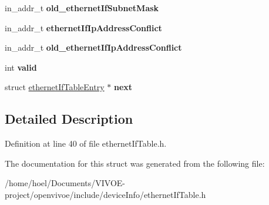 \begin{DoxyCompactItemize}
\item 
in\+\_\+addr\+\_\+t {\bfseries old\+\_\+ethernet\+If\+Subnet\+Mask}\hypertarget{structethernetIfTableEntry_a87976ec94cbf9aaa5c88cf82da388ba0}{}\label{structethernetIfTableEntry_a87976ec94cbf9aaa5c88cf82da388ba0}

\item 
in\+\_\+addr\+\_\+t {\bfseries ethernet\+If\+Ip\+Address\+Conflict}\hypertarget{structethernetIfTableEntry_a974502ae05ad855239d8cd9972effcb9}{}\label{structethernetIfTableEntry_a974502ae05ad855239d8cd9972effcb9}

\item 
in\+\_\+addr\+\_\+t {\bfseries old\+\_\+ethernet\+If\+Ip\+Address\+Conflict}\hypertarget{structethernetIfTableEntry_a4994f612ad493b7d11c9c9882c20008c}{}\label{structethernetIfTableEntry_a4994f612ad493b7d11c9c9882c20008c}

\item 
int {\bfseries valid}\hypertarget{structethernetIfTableEntry_ab9eda65a96498af5b001bb61121ce8f9}{}\label{structethernetIfTableEntry_ab9eda65a96498af5b001bb61121ce8f9}

\item 
struct \hyperlink{structethernetIfTableEntry}{ethernet\+If\+Table\+Entry} $\ast$ {\bfseries next}\hypertarget{structethernetIfTableEntry_a635274e65a9e28788b8850e775b25ebe}{}\label{structethernetIfTableEntry_a635274e65a9e28788b8850e775b25ebe}

\end{DoxyCompactItemize}


\subsection{Detailed Description}


Definition at line 40 of file ethernet\+If\+Table.\+h.



The documentation for this struct was generated from the following file\+:\begin{DoxyCompactItemize}
\item 
/home/hoel/\+Documents/\+V\+I\+V\+O\+E-\/project/openvivoe/include/device\+Info/ethernet\+If\+Table.\+h\end{DoxyCompactItemize}
